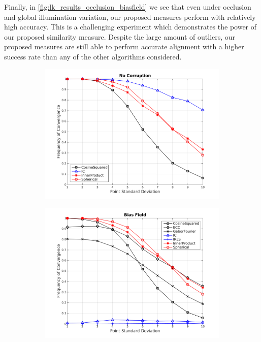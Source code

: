 Finally, in \cref{fig:lk_results_occlusion_biasfield} we see that even
under occlusion and global illumination variation, our proposed measures perform
with relatively high accuracy. This is a challenging experiment which
demonstrates the power of our proposed similarity measure. Despite the large
amount of outliers, our proposed measures are still able to perform accurate
alignment with a higher success rate than any of the other algorithms
considered.
\begin{figure}
    \centering
    \begin{subfigure}{0.52\textwidth}
        \includegraphics[width=\textwidth]{statistical_normals/lk/3d/images/NoCorruption_Smoothing_2-crop}
        \caption{}\label{fig:lk_results_nocorruption}
    \end{subfigure} \hspace*{-1cm}
    \begin{subfigure}{0.52\textwidth}
        \includegraphics[width=\textwidth]{statistical_normals/lk/3d/images/BiasField_Smoothing_2-crop}

\end{subfigure}
\end{figure}
